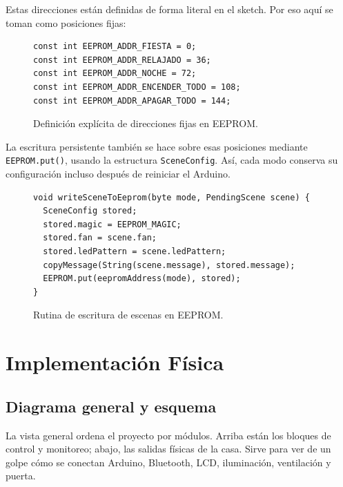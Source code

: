 \documentclass[12pt,a4paper]{article}
\begin{document}
Estas direcciones están definidas de forma literal en el sketch. Por eso aquí se toman como posiciones fijas:

\begin{figure}[H]
    \centering
    \begin{minipage}{0.9\textwidth}
        \begin{lstlisting}[basicstyle=\ttfamily\footnotesize]
const int EEPROM_ADDR_FIESTA = 0;
const int EEPROM_ADDR_RELAJADO = 36;
const int EEPROM_ADDR_NOCHE = 72;
const int EEPROM_ADDR_ENCENDER_TODO = 108;
const int EEPROM_ADDR_APAGAR_TODO = 144;
        \end{lstlisting}
    \end{minipage}
    \caption{Definición explícita de direcciones fijas en EEPROM.}
\end{figure}

La escritura persistente también se hace sobre esas posiciones mediante \texttt{EEPROM.put()}, usando la estructura \texttt{SceneConfig}. Así, cada modo conserva su configuración incluso después de reiniciar el Arduino.

\begin{figure}[H]
    \centering
    \begin{minipage}{0.9\textwidth}
        \begin{lstlisting}[basicstyle=\ttfamily\footnotesize]
void writeSceneToEeprom(byte mode, PendingScene scene) {
  SceneConfig stored;
  stored.magic = EEPROM_MAGIC;
  stored.fan = scene.fan;
  stored.ledPattern = scene.ledPattern;
  copyMessage(String(scene.message), stored.message);
  EEPROM.put(eepromAddress(mode), stored);
}
        \end{lstlisting}
    \end{minipage}
    \caption{Rutina de escritura de escenas en EEPROM.}
\end{figure}

\section{Implementación Física}

\subsection{Diagrama general y esquema}
La vista general ordena el proyecto por módulos. Arriba están los bloques de control y monitoreo; abajo, las salidas físicas de la casa. Sirve para ver de un golpe cómo se conectan Arduino, Bluetooth, LCD, iluminación, ventilación y puerta.
\end{document}
